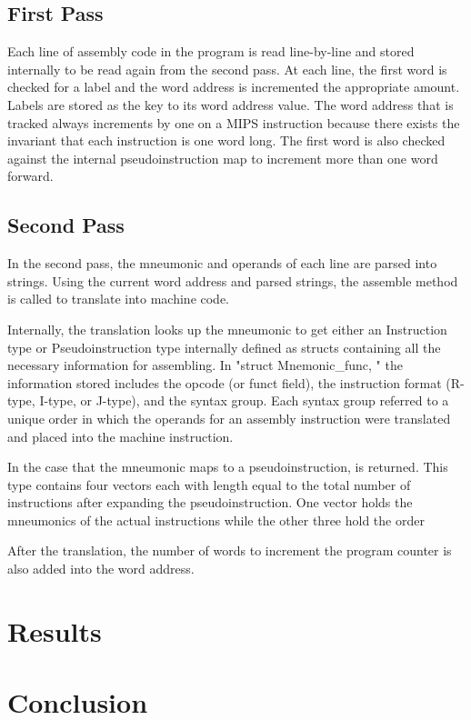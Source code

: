 \documentclass[titlepage]{article}
\begin{document}
\subsection*{First Pass}
Each line of assembly code in the program is read line-by-line and stored 
internally to be read again from the second pass. At each line, the first word 
is checked for a label and the word address is incremented the appropriate 
amount. Labels are stored as the key to its word address value. The word address
that is tracked always increments by one on a MIPS instruction because there 
exists the invariant that each instruction is one word long. The first word is
also checked against the internal pseudoinstruction map to increment more than 
one word forward.

\subsection*{Second Pass}
In the second pass, the mneumonic and operands of each line are parsed into 
strings. Using the current word address and parsed strings, the assemble method 
is called to translate into machine code. 

Internally, the translation looks up the mneumonic to get either an Instruction
type or Pseudoinstruction type internally defined as structs containing all the
necessary information for assembling. In "struct Mnemonic\_func, " the 
information stored includes the opcode (or funct field), the instruction format 
(R-type, I-type, or J-type), and the syntax group. Each syntax group referred to
a unique order in which the operands for an assembly instruction were translated
and placed into the machine instruction. 

In the case that the mneumonic maps to a pseudoinstruction, is returned. This 
type contains four vectors each with length equal to the total number of 
instructions after expanding the pseudoinstruction. One vector holds the 
mneumonics of the actual instructions while the other three hold the order 

After the translation, the number of words to increment the program counter is
also added into the word address.

\section*{Results}



\section*{Conclusion}

\end{document}
